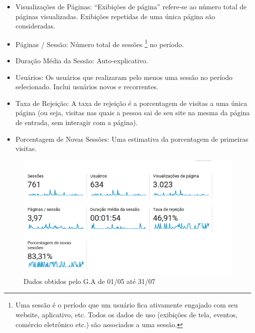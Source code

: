 \begin{itemize}
\item Visualizações de Páginas: ``Exibições de página'' refere-se ao número total de páginas visualizadas. Exibições repetidas de uma única página são consideradas.
\item Páginas / Sessão: Número total de sessões \footnote{Uma sessão é o período que um usuário fica ativamente engajado com seu website, aplicativo, etc. Todos os dados de uso (exibições de tela, eventos, comércio eletrônico etc.) são associados a uma sessão.} no período.
\item Duração Média da Sessão: Auto-explicativo.
\item Usuários: Os usuários que realizaram pelo menos uma sessão no período selecionado. Inclui usuários novos e recorrentes.
\item Taxa de Rejeição: A taxa de rejeição é a porcentagem de visitas a uma única página (ou seja, visitas nas quais a pessoa sai de seu site na mesma da página de entrada, sem interagir com a página).
\item Porcentagem de Novas Sessões: Uma estimativa da porcentagem de primeiras visitas.

\end{itemize}

\begin{figure}[htb]
\includegraphics[width=15cm]{figuras/analytics_1interacao_dados}
\caption{\label{fig:analytics_1interacao_dados} Dados obtidos pelo G.A de 01/05 até 31/07}
\end{figure}

